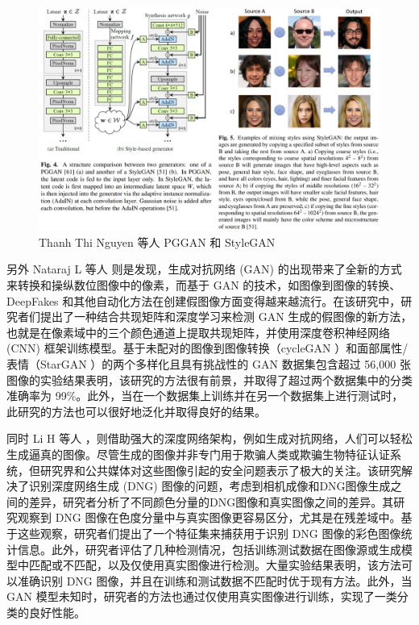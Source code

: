\begin{figure}[htb]
\centering 
\includegraphics[width=1.05\textwidth]{img/ch3m11.png} 
\caption{ Thanh Thi Nguyen 等人 \cite{https://doi.org/10.48550/arxiv.1909.11573} PGGAN 和 StyleGAN}
\label{Test}
\end{figure}

另外 Nataraj L 等人 \cite{nataraj2019detecting}则是发现，生成对抗网络 (GAN) 的出现带来了全新的方式来转换和操纵数位图像中的像素，而基于 GAN 的技术，如图像到图像的转换、DeepFakes 和其他自动化方法在创建假图像方面变得越来越流行。在该研究中，研究者们提出了一种结合共现矩阵和深度学习来检测 GAN 生成的假图像的新方法，也就是在像素域中的三个颜色通道上提取共现矩阵，并使用深度卷积神经网络 (CNN) 框架训练模型。基于未配对的图像到图像转换（cycleGAN ）和面部属性/表情（StarGAN ）的两个多样化且具有挑战性的 GAN 数据集包含超过 56,000 张图像的实验结果表明，该研究的方法很有前景，并取得了超过两个数据集中的分类准确率为 99\%。此外，当在一个数据集上训练并在另一个数据集上进行测试时，此研究的方法也可以很好地泛化并取得良好的结果。

同时 Li H 等人 \cite{li2020identification}，则借助强大的深度网络架构，例如生成对抗网络，人们可以轻松生成逼真的图像。尽管生成的图像并非专门用于欺骗人类或欺骗生物特征认证系统，但研究界和公共媒体对这些图像引起的安全问题表示了极大的关注。该研究解决了识别深度网络生成 (DNG) 图像的问题，考虑到相机成像和DNG图像生成之间的差异，研究者分析了不同颜色分量的DNG图像和真实图像之间的差异。其研究观察到 DNG 图像在色度分量中与真实图像更容易区分，尤其是在残差域中。基于这些观察，研究者们提出了一个特征集来捕获用于识别 DNG 图像的彩色图像统计信息。此外，研究者评估了几种检测情况，包括训练测试数据在图像源或生成模型中匹配或不匹配，以及仅使用真实图像进行检测。大量实验结果表明，该方法可以准确识别 DNG 图像，并且在训练和测试数据不匹配时优于现有方法。此外，当 GAN 模型未知时，研究者的方法也通过仅使用真实图像进行训练，实现了一类分类的良好性能。

